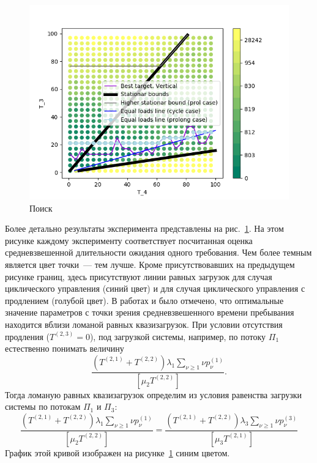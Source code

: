 \documentclass[a4paper,12pt,russian]{extarticle}
\begin{document}
\begin{figure}[h]
\centering
\includegraphics[scale=0.9]{0_1_thres_10_target.png} 
\caption{Поиск }
\label{Experiment:targets}
\end{figure}


Более детально результаты эксперимента представлены на рис.~\ref{Experiment:targets}. На этом рисунке каждому эксперименту соответствует посчитанная оценка средневзвешенной длительности ожидания одного требования. Чем более темным является цвет точки~--- тем лучше. Кроме присутствовавших на предыдущем рисунке границ, здесь присутствуют линии равных загрузок для случая циклического управления (синий цвет) и для случая циклического управления с продлением (голубой цвет). В работах \cite{Fedotkin:A:2009} и \cite{Fedotkin:Rachinskaya:2016} было отмечено, что оптимальные значение параметров с точки зрения средневзвешенного времени пребывания находится вблизи ломаной равных квазизагрузок. При условии отсутствия продления ($T^{(2,3)}=0$),  под загрузкой системы, например, по потоку $\Pi_1$ естественно понимать величину
\begin{equation}
\frac{(T^{(2,1)} + T^{(2,2)})\lambda_1 \sum_{\nu\geqslant 1}\nu p_{\nu}^{(1)}}{[\mu_2 T^{(2,2)}]}.
\end{equation}
Тогда ломаную равных квазизагрузок определим из условия равенства загрузки системы по потокам $\Pi_1$ и $\Pi_3$:
\begin{equation}
\frac{(T^{(2,1)} + T^{(2,2)})\lambda_1 \sum_{\nu\geqslant 1}\nu p_{\nu}^{(1)}}{[\mu_2 T^{(2,2)}]}=
    \frac{(T^{(2,1)} + T^{(2,2)})\lambda_3 \sum_{\nu\geqslant 1}\nu p_{\nu}^{(3)}}{[\mu_3 T^{(2,1)}]}
\end{equation}
График этой кривой изображен на рисунке~\ref{Experiment:targets} синим цветом. 
\end{document}
